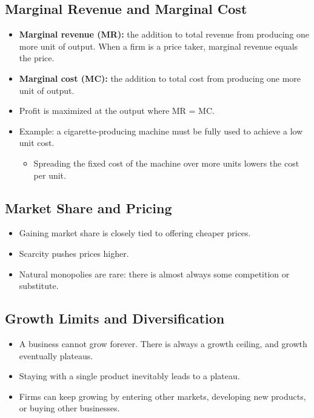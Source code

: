 \documentclass[11pt, a4paper]{article}
\begin{document}
\subsection{Marginal Revenue and Marginal Cost}
\begin{itemize}
  \item \textbf{Marginal revenue (MR):} the addition to total revenue from
        producing one more unit of output. When a firm is a price taker,
        marginal revenue equals the price.
  \item \textbf{Marginal cost (MC):} the addition to total cost from
        producing one more unit of output.
  \item Profit is maximized at the output where MR = MC.
  \item Example: a cigarette-producing machine must be fully used to achieve
        a low unit cost.
        \begin{itemize}
          \item Spreading the fixed cost of the machine over more units
                lowers the cost per unit.
        \end{itemize}
\end{itemize}

\subsection{Market Share and Pricing}
\begin{itemize}
  \item Gaining market share is closely tied to offering cheaper prices.
  \item Scarcity pushes prices higher.
  \item Natural monopolies are rare: there is almost always some
        competition or substitute.
\end{itemize}

\subsection{Growth Limits and Diversification}
\begin{itemize}
  \item A business cannot grow forever. There is always a growth ceiling,
        and growth eventually plateaus.
  \item Staying with a single product inevitably leads to a plateau.
  \item Firms can keep growing by entering other markets, developing new
        products, or buying other businesses.
\end{itemize}
\end{document}

